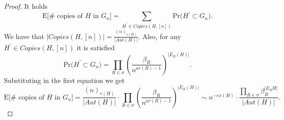 \documentclass[12pt,notitlepage,a4paper]{article}
\theoremstyle{definition}
\newcommand{\N}{\mathbb{N}}
\newcommand{\Ln}{\lim\limits_{n\to \infty}}
\newcommand{\PR}[1]{\mathrm{Pr}\big(#1\big)}
\begin{document}
\begin{proof}
It holds
\[
 \mathrm{E}\big[\# \text{ copies of }H \text{ in } G_n\big]=
 \sum_{H^\prime \in Copies(H,[n])} \PR{H^\prime \subset G_n}.
\]	
We have that $|Copies(H,[n])|=\frac{(n)_{v(H)}}{|Aut(H)|}$. Also, 
for any $H^\prime \in Copies(H,[n])$ it is satisfied
\[
\PR{H^\prime \subset G_n}= \prod_{R\in \sigma} \left(\frac{\beta_R}{n^{ar(R)-1}} 
\right)^{|E_R(H)|}.
\]
Substituting in the first equation we get
\[
\mathrm{E}\big[\# \text{ copies of }H \text{ in } G_n\big]=
\frac{(n)_{v(H)}}{|Aut(H)|}\cdot
\prod_{R\in \sigma} \left(\frac{\beta_R}{n^{ar(R)-1}}\right)^{|E_R(H)|}
\sim
n^{-ex(H)} \cdot \frac{\prod_{R\in \sigma} \beta_R^{
|E_R{H}| }}{|Aut(H)|}.
\]	



\end{proof}
\end{document}
